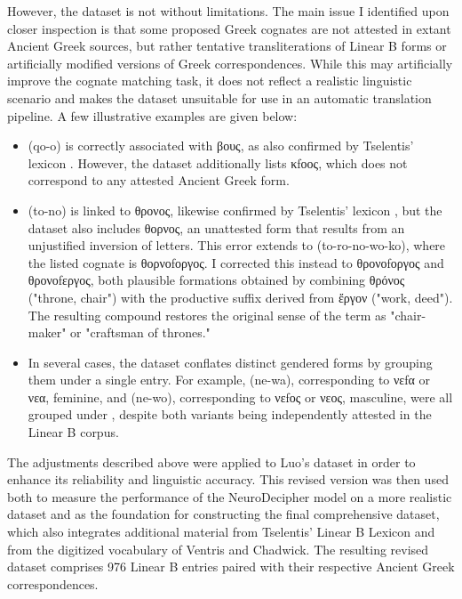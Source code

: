 However, the dataset is not without limitations.
The main issue I identified upon closer inspection is that some proposed Greek cognates are not attested in extant Ancient Greek sources, but rather tentative transliterations of Linear B forms or artificially modified versions of Greek correspondences.
While this may artificially improve the cognate matching task, it does not reflect a realistic linguistic scenario and makes the dataset unsuitable for use in an automatic translation pipeline.
A few illustrative examples are given below:

\begin{itemize}
\item \textlinb{\Bqo\Bo} (qo-o) is correctly associated with \textgreek{βους}, as also confirmed by Tselentis' lexicon \cite{tselentis}. However, the dataset additionally lists \textgreek{κfοος}, which does not correspond to any attested Ancient Greek form.
\item \textlinb{\Bto\Bo} (to-no) is linked to \textgreek{θρονος}, likewise confirmed by Tselentis' lexicon \cite{tselentis}, but the dataset also includes \textgreek{θορνος}, an unattested form that results from an unjustified inversion of letters.
This error extends to \textlinb{\Bto\Bro\Bno\Bwo\Bko} (to-ro-no-wo-ko), where the listed cognate is \textgreek{θορνοfοργος}. I corrected this instead to \textgreek{θρονοfοργος} and \textgreek{θρονοfεργος}, both plausible formations obtained by combining \textgreek{θρόνος} ("throne, chair") with the productive suffix derived from \textgreek{ἔργον} ("work, deed"). The resulting compound restores the original sense of the term as "chair-maker" or "craftsman of thrones."
\item In several cases, the dataset conflates distinct gendered forms by grouping them under a single entry. For example, \textlinb{\Bne\Bwa} (ne-wa), corresponding to \textgreek{νεfα} or \textgreek{νεα}, feminine, and \textlinb{\Bne\Bwo} (ne-wo), corresponding to \textgreek{νεfος} or \textgreek{νεος}, masculine, were all grouped under \textlinb{\Bne\Bwa}, despite both variants being independently attested in the Linear B corpus.
\end{itemize}

The adjustments described above were applied to Luo's dataset in order to enhance its reliability and linguistic accuracy.
This revised version was then used both to measure the performance of the NeuroDecipher model on a more realistic dataset and as the foundation for constructing the final comprehensive dataset, which also integrates additional material from Tselentis' Linear B Lexicon and from the digitized vocabulary of Ventris and Chadwick.
The resulting revised dataset comprises 976 Linear B entries paired with their respective Ancient Greek correspondences.

